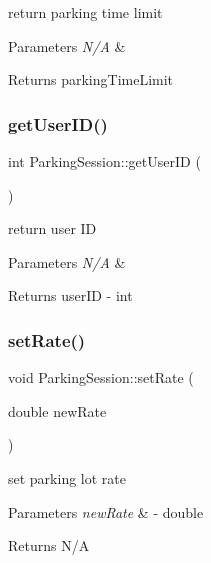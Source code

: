 return parking time limit 


\begin{DoxyParams}{Parameters}
{\em N/A} & \\
\hline
\end{DoxyParams}
\begin{DoxyReturn}{Returns}
parking\+Time\+Limit 
\end{DoxyReturn}
\mbox{\label{class_parking_session_a1a49f4f70f7aceaba627f6e9c7a1e6c7}} 
\subsubsection{\texorpdfstring{get\+User\+I\+D()}{getUserID()}}
{\footnotesize\ttfamily int Parking\+Session\+::get\+User\+ID (\begin{DoxyParamCaption}{ }\end{DoxyParamCaption})}



return user ID 


\begin{DoxyParams}{Parameters}
{\em N/A} & \\
\hline
\end{DoxyParams}
\begin{DoxyReturn}{Returns}
user\+ID -\/ int 
\end{DoxyReturn}
\mbox{\label{class_parking_session_a7db9217ee7a69467c76787b229fd5a34}} 
\subsubsection{\texorpdfstring{set\+Rate()}{setRate()}}
{\footnotesize\ttfamily void Parking\+Session\+::set\+Rate (\begin{DoxyParamCaption}\item[{double}]{new\+Rate }\end{DoxyParamCaption})}



set parking lot rate 


\begin{DoxyParams}{Parameters}
{\em new\+Rate} & -\/ double \\
\hline
\end{DoxyParams}
\begin{DoxyReturn}{Returns}
N/A 
\end{DoxyReturn}
\mbox{\label{class_parking_session_af2014f31a7e793e7edbdcbc40195aff9}} 
